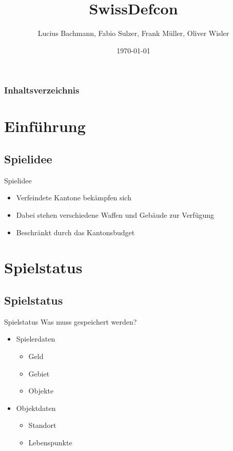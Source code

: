 \documentclass[12pt, utf8]{beamer}
\author{Lucius Bachmann, Fabio Sulzer, Frank Müller, Oliver Wisler}
\title{SwissDefcon}
\date{\today}
\begin{document}
\begin{frame}
\titlepage
\end{frame}

\begin{frame}
\frametitle{Inhaltsverzeichnis}
\setcounter{tocdepth}{1}
\tableofcontents
\end{frame}


\section{Einführung}
\subsection{Spielidee}
\begin{frame}{Spielidee}
\begin{itemize}
\item Verfeindete Kantone bekämpfen sich
\item Dabei stehen verschiedene Waffen und Gebäude zur Verfügung
\item Beschränkt durch das Kantonsbudget
\end{itemize}
\end{frame}

\section{Spielstatus}

\subsection{Spielstatus}
\begin{frame}{Spielstatus}
Was muss gespeichert werden?
\begin{multicols}{2}
\begin{itemize}
\item Spielerdaten
\begin{itemize}
\item Geld
\item Gebiet
\item Objekte
\end{itemize}
\item Objektdaten
\begin{itemize}
\item Standort
\item Lebenspunkte
\end{itemize}
\end{itemize}
\end{multicols}
\end{frame}
\end{document}
